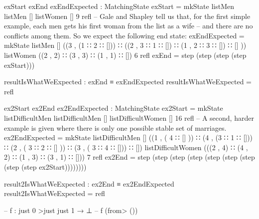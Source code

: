 \documentclass{article}
\begin{document}
\begin{code}
{exStart exEnd exEndExpected : MatchingState
exStart       = mkState listMen listMen [] listWomen [] 9 refl
-- Gale and Shapley tell us that, for the first simple example, each men gets his first woman from the list as a wife
-- and there are no conflicts among them. So we expect the following end state:
exEndExpected = mkState listMen [] ((3 , (1 ∷ 2 ∷ [])) ∷ ((2 , 3 ∷ 1 ∷ []) ∷ (1 , 2 ∷ 3 ∷ []) ∷ [] )) listWomen ((2 , 2) ∷ (3 , 3) ∷ (1 , 1) ∷ []) 6 refl
exEnd         = step (step (step (step exStart)))

resultIsWhatWeExpected : exEnd ≡ exEndExpected
resultIsWhatWeExpected = refl

ex2Start ex2End ex2EndExpected : MatchingState
ex2Start         = mkState listDifficultMen listDifficultMen [] listDifficultWomen [] 16 refl
-- A second, harder example is given where there is only one possible stable set of marriages.
ex2EndExpected   = mkState listDifficultMen [] ((1 , ( 4 ∷ [] )) ∷ (4 , (3 ∷ 1 ∷ [])) ∷ (2 , ( 3 ∷ 2 ∷ [] )) ∷ (3 , ( 3 ∷ 4 ∷ [])) ∷ []) listDifficultWomen (((2 , 4) ∷ (4 , 2) ∷ (1 , 3) ∷ (3 , 1) ∷ [])) 7 refl
ex2End           = step (step (step (step (step (step (step (step (step ex2Start))))))))

result2IsWhatWeExpected : ex2End ≡ ex2EndExpected
result2IsWhatWeExpected = refl

-- f : just 0 >just just 1 → ⊥
-- f (\AgdaUnderscore{}from>\AgdaUnderscore{} ())

}
\end{code}
\end{document}
